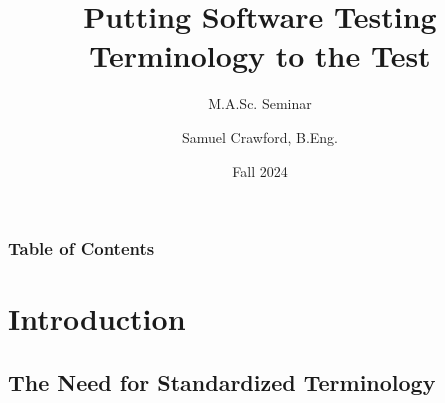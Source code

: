 \documentclass{beamer}
\title[Testing Terminology]{Putting Software Testing Terminology to the Test}
\subtitle{M.A.Sc. Seminar}
\author[Samuel Crawford]{Samuel Crawford, B.Eng.}
\institute[McMaster University]{McMaster University\\Department of Computing and Software}
\date{Fall 2024}
\begin{document}

\frame{\titlepage}


\begin{frame}
    \frametitle{Table of Contents}
    \tableofcontents
\end{frame}

\section{Introduction}

\subsection{The Need for Standardized Terminology}
\end{document}
